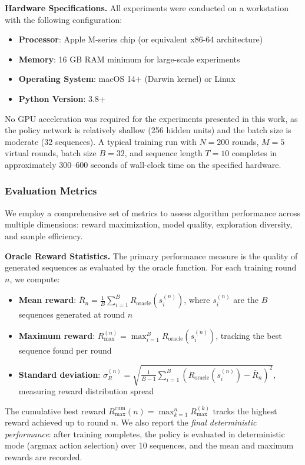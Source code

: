 \documentclass[conference]{IEEEtran}
\begin{document}
\textbf{Hardware Specifications.} All experiments were conducted on a workstation with the following configuration:
\begin{itemize}
    \item \textbf{Processor}: Apple M-series chip (or equivalent x86-64 architecture)
    \item \textbf{Memory}: 16 GB RAM minimum for large-scale experiments
    \item \textbf{Operating System}: macOS 14+ (Darwin kernel) or Linux
    \item \textbf{Python Version}: 3.8+
\end{itemize}

No GPU acceleration was required for the experiments presented in this work, as the policy network is relatively shallow (256 hidden units) and the batch size is moderate (32 sequences). A typical training run with $N = 200$ rounds, $M = 5$ virtual rounds, batch size $B = 32$, and sequence length $T = 10$ completes in approximately 300--600 seconds of wall-clock time on the specified hardware.

\subsubsection{Evaluation Metrics}

We employ a comprehensive set of metrics to assess algorithm performance across multiple dimensions: reward maximization, model quality, exploration diversity, and sample efficiency.

\textbf{Oracle Reward Statistics.} The primary performance measure is the quality of generated sequences as evaluated by the oracle function. For each training round $n$, we compute:
\begin{itemize}
    \item \textbf{Mean reward}: $\bar{R}_n = \frac{1}{B}\sum_{i=1}^{B} R_{\text{oracle}}(s_i^{(n)})$, where $s_i^{(n)}$ are the $B$ sequences generated at round $n$
    \item \textbf{Maximum reward}: $R_{\max}^{(n)} = \max_{i=1}^{B} R_{\text{oracle}}(s_i^{(n)})$, tracking the best sequence found per round
    \item \textbf{Standard deviation}: $\sigma_R^{(n)} = \sqrt{\frac{1}{B-1}\sum_{i=1}^{B}(R_{\text{oracle}}(s_i^{(n)}) - \bar{R}_n)^2}$, measuring reward distribution spread
\end{itemize}

The cumulative best reward $R_{\max}^{\text{cum}}(n) = \max_{k=1}^{n} R_{\max}^{(k)}$ tracks the highest reward achieved up to round $n$. We also report the \textit{final deterministic performance}: after training completes, the policy is evaluated in deterministic mode (argmax action selection) over 10 sequences, and the mean and maximum rewards are recorded.
\end{document}
